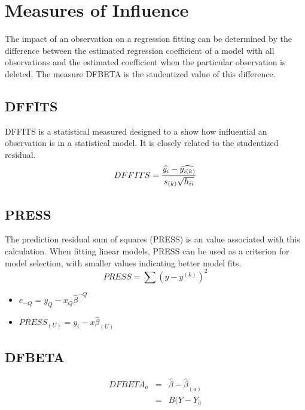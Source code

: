 \documentclass[12pt, a4paper]{report}
\begin{document}

\newpage
	\section{Measures of Influence} %
	
	The impact of an observation on a regression fitting can be determined by the difference between the estimated regression coefficient of a model with all observations and the estimated coefficient when the particular observation is deleted. The measure DFBETA is the studentized value of this difference.
	
	
	\subsection{DFFITS} %
	DFFITS is a statistical measured designed to a show how influential an observation is in a statistical model. It is closely related to the studentized residual.
	\begin{displaymath} DFFITS = {\widehat{y_i} -
		\widehat{y_{i(k)}} \over s_{(k)} \sqrt{h_{ii}}} \end{displaymath}
	
	
	\subsection{PRESS} %
	The prediction residual sum of squares (PRESS) is an value associated with this calculation. When fitting linear models, PRESS can be used as a criterion for model selection, with smaller values indicating better model fits.
	\begin{equation}
	PRESS = \sum(y-y^{(k)})^2
	\end{equation}
	
	
	\begin{itemize}
		\item $e_{-Q} = y_{Q} - x_{Q}\hat{\beta}^{-Q}$
		\item $PRESS_{(U)} = y_{i} - x\hat{\beta}_{(U)}$
	\end{itemize}
	
	\subsection*{DFBETA} %
	\begin{eqnarray}
	DFBETA_{a} &=& \hat{\beta} - \hat{\beta}_{(a)} \\
	&=& B(Y-Y_{\bar{a}}
	\end{eqnarray}
	
\end{document}
